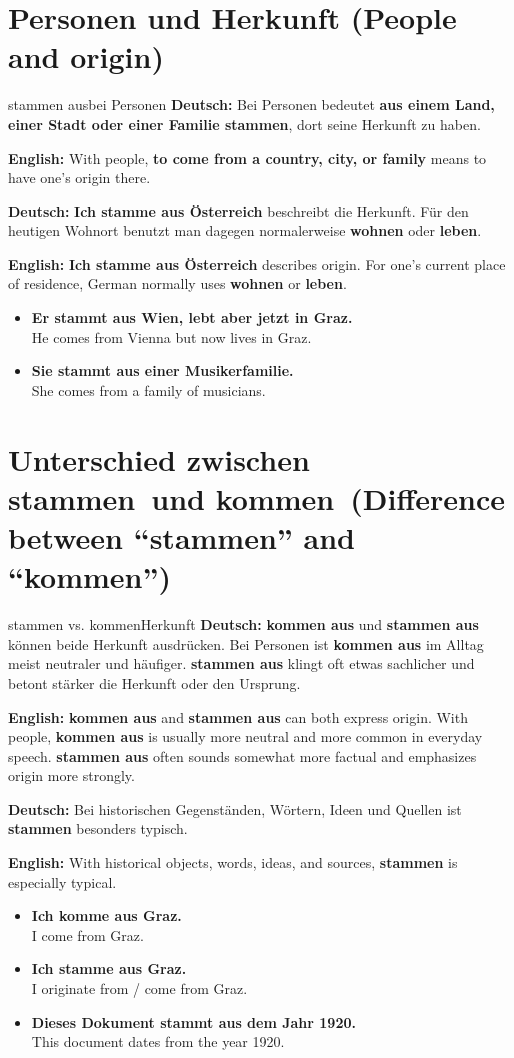 \documentclass[a4paper,11pt]{article}
\newcommand{\GermanText}[1]{\textbf{Deutsch: }#1\par}
\newcommand{\EnglishText}[1]{{\small\color{SoftGray}\textbf{English: }#1\par}}
\newcommand{\ExampleItem}[2]{\item \textbf{#1}\\{\small\color{SoftGray}#2}}
\begin{document}
\section{Personen und Herkunft \textnormal{(People and origin)}}
\begin{grammarentry}{stammen aus}{bei Personen}
\GermanText{Bei Personen bedeutet \textbf{aus einem Land, einer Stadt oder einer Familie stammen}, dort seine Herkunft zu haben.}
\EnglishText{With people, \textbf{to come from a country, city, or family} means to have one's origin there.}
\GermanText{\textbf{Ich stamme aus Österreich} beschreibt die Herkunft. Für den heutigen Wohnort benutzt man dagegen normalerweise \textbf{wohnen} oder \textbf{leben}.}
\EnglishText{\textbf{Ich stamme aus Österreich} describes origin. For one's current place of residence, German normally uses \textbf{wohnen} or \textbf{leben}.}
\end{grammarentry}
\begin{exbox}
\begin{itemize}
\ExampleItem{Er stammt aus Wien, lebt aber jetzt in Graz.}{He comes from Vienna but now lives in Graz.}
\ExampleItem{Sie stammt aus einer Musikerfamilie.}{She comes from a family of musicians.}
\end{itemize}
\end{exbox}

\section{Unterschied zwischen \glqq stammen\grqq\ und \glqq kommen\grqq\ \textnormal{(Difference between ``stammen'' and ``kommen'')}}
\begin{grammarentry}{stammen vs. kommen}{Herkunft}
\GermanText{\textbf{kommen aus} und \textbf{stammen aus} können beide Herkunft ausdrücken. Bei Personen ist \textbf{kommen aus} im Alltag meist neutraler und häufiger. \textbf{stammen aus} klingt oft etwas sachlicher und betont stärker die Herkunft oder den Ursprung.}
\EnglishText{\textbf{kommen aus} and \textbf{stammen aus} can both express origin. With people, \textbf{kommen aus} is usually more neutral and more common in everyday speech. \textbf{stammen aus} often sounds somewhat more factual and emphasizes origin more strongly.}
\GermanText{Bei historischen Gegenständen, Wörtern, Ideen und Quellen ist \textbf{stammen} besonders typisch.}
\EnglishText{With historical objects, words, ideas, and sources, \textbf{stammen} is especially typical.}
\end{grammarentry}
\begin{exbox}
\begin{itemize}
\ExampleItem{Ich komme aus Graz.}{I come from Graz.}
\ExampleItem{Ich stamme aus Graz.}{I originate from / come from Graz.}
\ExampleItem{Dieses Dokument stammt aus dem Jahr 1920.}{This document dates from the year 1920.}
\end{itemize}
\end{exbox}
\end{document}
